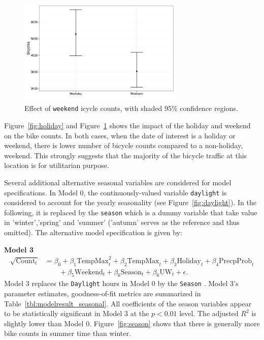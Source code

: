 \documentclass [11pt, proquest] {uwthesis}[2015/03/03]
\begin{document}
\begin{figure}
\centering
  \includegraphics[width=0.7\textwidth]{figures/sim/Wknd}
  \caption{Effect of \texttt{weekend} icycle counts, with shaded 95\% confidence regions.}
  \label{fig:weekend}
\end{figure}

Figure~\ref{fig:holiday} and Figure~\ref{fig:weekend} shows the impact of the holiday and weekend on the bike counts. In both cases, when the date of interest is a holiday or weekend, there is lower number of bicycle counts compared to a non-holiday, weekend. This strongly suggests that the majority of the bicycle traffic at this location is for utilitarian purpose. 

%

Several additional alternative seasonal variables are considered for model specifications. In Model 0,  the continuously-valued variable \texttt{daylight} is considered to account for the yearly seasonality (see Figure~\ref{fig:daylight}). In the following, it is replaced by the \texttt{season} which is a dummy variable that take value in 'winter','spring' and 'summer' ('autumn' serves as the reference and thus omitted). The alternative model specification is given by:

\textbf{Model 3}
\begin{align}
\sqrt{\text{Count}_t} &= \beta_0 + \beta_1 \text{TempMax}^2_t + \beta_2 \text{TempMax}_t + \beta_3 \text{Holiday}_t + \beta_4 \text{PrecpProb}_t  \nonumber\\
&\qquad + \beta_5 \text{Weekend}_t + \beta_6 \text{Season}_t + \beta_6 \text{UW}_t + \epsilon.\label{eqref:model3}
\end{align}
Model 3 replaces the \texttt{Daylight} hours in Model 0 by the \texttt{Season} . Model 3's parameter estimates, goodness-of-fit metrics are summarized in Table~\ref{tbl:modelresult_seasonal}. All coefficients of the season variables appear to be  statistically significant in Model 3 at the $p<0.01$ level. The adjusted $R^2$ is slightly lower than Model 0. Figure~\ref{fig:season} shows that there is generally more bike counts in summer time than winter.
\end{document}
